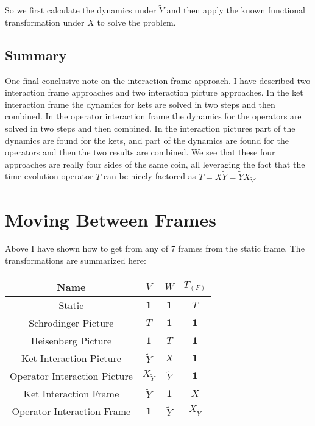\documentclass[12pt]{article}
\newcommand{\bv}[1]{\boldsymbol{#1}}
\begin{document}
So we first calculate the dynamics under $\tilde{Y}$ and then apply the known functional transformation under $X$ to solve the problem.


\subsection{Summary}

One final conclusive note on the interaction frame approach. I have described two interaction frame approaches and two interaction picture approaches. In the ket interaction frame the dynamics for kets are solved in two steps and then combined. In the operator interaction frame the dynamics for the operators are solved in two steps and then combined. In the interaction pictures part of the dynamics are found for the kets, and part of the dynamics are found for the operators and then the two results are combined. We see that these four approaches are really four sides of the same coin, all leveraging the fact that the time evolution operator $T$ can be nicely factored as $T = X\tilde{Y} = \tilde{Y}X_{\tilde{Y}}$.

\section{Moving Between Frames}

Above I have shown how to get from any of 7 frames from the static frame. The transformations are summarized here:

\setlength{\extrarowheight}{3pt}
\begin{center}
\begin{tabular}{|c|c|c|c|}
\hline
Name & $V$ & $W$ & $T_{(F)}$ \\ \hline
Static & $\bv{1}$ & $\bv{1}$ & $T$\\ \hline
Schrodinger Picture & $T$ & $\bv{1}$ & $\bv{1}$\\ \hline
Heisenberg Picture & $\bv{1}$ & $T$ & $\bv{1}$\\ \hline
Ket Interaction Picture & $\tilde{Y}$ & $X$ & $\bv{1}$\\ \hline
Operator Interaction Picture & $X_{\tilde{Y}}$ & $\tilde{Y}$ & $\bv{1}$\\ \hline
Ket Interaction Frame & $\tilde{Y}$ & $\bv{1}$ & $X$\\ \hline
Operator Interaction Frame & $\bv{1}$ & $\tilde{Y}$ & $X_{\tilde{Y}}$\\ \hline
\end{tabular}
\end{center}
\end{document}
